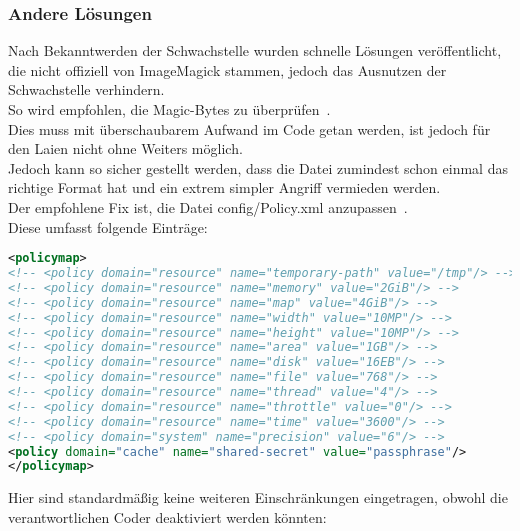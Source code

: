 
\subsubsection{Andere Lösungen}

Nach Bekanntwerden der Schwachstelle wurden schnelle Lösungen veröffentlicht, die nicht offiziell von ImageMagick stammen, jedoch das Ausnutzen der Schwachstelle verhindern.\\

So wird empfohlen, die Magic-Bytes zu überprüfen~\cite{ImageTragick}.\\
Dies muss mit überschaubarem Aufwand im Code getan werden, ist jedoch für den Laien nicht ohne Weiters möglich.\\
Jedoch kann so sicher gestellt werden, dass die Datei zumindest schon einmal das richtige Format hat und ein extrem simpler Angriff vermieden werden.\\

Der empfohlene Fix ist,  die Datei config/Policy.xml anzupassen~\cite{ImageTragick}.\\
Diese umfasst folgende Einträge:\\

\begin{lstlisting}[firstnumber=47, language=XML, caption=config/Policy.xml Inhalt,label={lst:lstlisting}]
<policymap>
<!-- <policy domain="resource" name="temporary-path" value="/tmp"/> -->
<!-- <policy domain="resource" name="memory" value="2GiB"/> -->
<!-- <policy domain="resource" name="map" value="4GiB"/> -->
<!-- <policy domain="resource" name="width" value="10MP"/> -->
<!-- <policy domain="resource" name="height" value="10MP"/> -->
<!-- <policy domain="resource" name="area" value="1GB"/> -->
<!-- <policy domain="resource" name="disk" value="16EB"/> -->
<!-- <policy domain="resource" name="file" value="768"/> -->
<!-- <policy domain="resource" name="thread" value="4"/> -->
<!-- <policy domain="resource" name="throttle" value="0"/> -->
<!-- <policy domain="resource" name="time" value="3600"/> -->
<!-- <policy domain="system" name="precision" value="6"/> -->
<policy domain="cache" name="shared-secret" value="passphrase"/>
</policymap>
\end{lstlisting}
\vspace{5mm}

Hier sind standardmäßig keine weiteren Einschränkungen eingetragen, obwohl die verantwortlichen Coder deaktiviert werden könnten:\\

